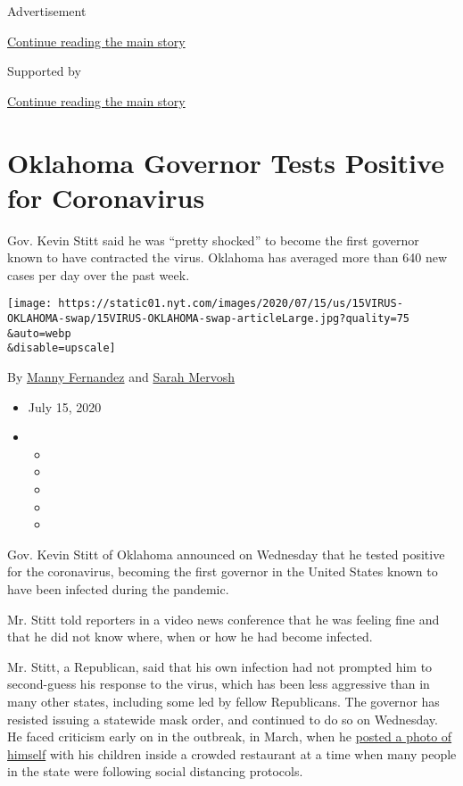 Advertisement

\protect\hyperlink{after-top}{Continue reading the main story}

Supported by

\protect\hyperlink{after-sponsor}{Continue reading the main story}

\hypertarget{oklahoma-governor-tests-positive-for-coronavirus}{%
\section{Oklahoma Governor Tests Positive for
Coronavirus}\label{oklahoma-governor-tests-positive-for-coronavirus}}

Gov. Kevin Stitt said he was ``pretty shocked'' to become the first
governor known to have contracted the virus. Oklahoma has averaged more
than 640 new cases per day over the past week.

\texttt{[image: https://static01.nyt.com/images/2020/07/15/us/15VIRUS-OKLAHOMA-swap/15VIRUS-OKLAHOMA-swap-articleLarge.jpg?quality=75\\\&auto=webp\\\&disable=upscale]}

By \href{https://www.nytimes.com/by/manny-fernandez}{Manny Fernandez}
and \href{https://www.nytimes.com/by/sarah-mervosh}{Sarah Mervosh}

\begin{itemize}
\item
  July 15, 2020
\item
  \begin{itemize}
  \item
  \item
  \item
  \item
  \item
  \end{itemize}
\end{itemize}

Gov. Kevin Stitt of Oklahoma announced on Wednesday that he tested
positive for the coronavirus, becoming the first governor in the United
States known to have been infected during the pandemic.

Mr. Stitt told reporters in a video news conference that he was feeling
fine and that he did not know where, when or how he had become infected.

Mr. Stitt, a Republican, said that his own infection had not prompted
him to second-guess his response to the virus, which has been less
aggressive than in many other states, including some led by fellow
Republicans. The governor has resisted issuing a statewide mask order,
and continued to do so on Wednesday. He faced criticism early on in the
outbreak, in March, when he
\href{https://twitter.com/SculptorJon/status/1239021903454453761}{posted
a photo of himself} with his children inside a crowded restaurant at a
time when many people in the state were following social distancing
protocols.

